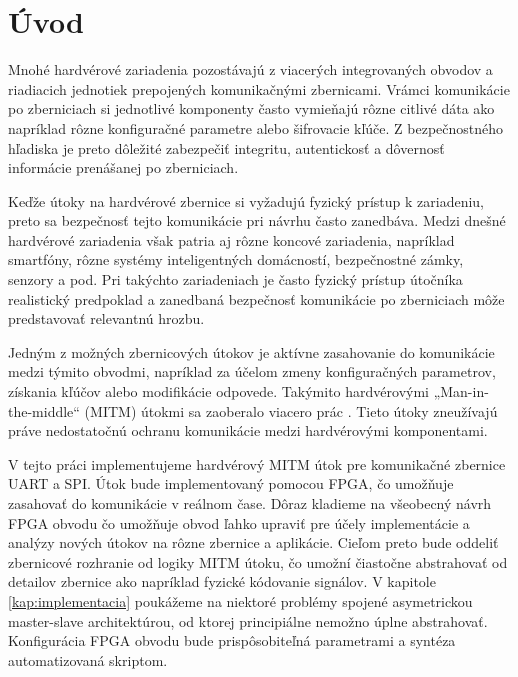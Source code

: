 \chapter*{Úvod} %

Mnohé hardvérové zariadenia pozostávajú z viacerých integrovaných obvodov a riadiacich jednotiek prepojených komunikačnými zbernicami. Vrámci komunikácie po zberniciach si jednotlivé komponenty často vymieňajú rôzne citlivé dáta ako napríklad rôzne konfiguračné parametre alebo šifrovacie kľúče.  Z bezpečnostného hľadiska je preto dôležité zabezpečiť integritu, autentickosť a dôvernosť informácie prenášanej po zberniciach.

Keďže útoky na hardvérové zbernice si vyžadujú fyzický prístup k zariadeniu, preto sa bezpečnosť tejto komunikácie pri návrhu často zanedbáva. Medzi dnešné hardvérové zariadenia však patria aj rôzne koncové zariadenia, napríklad smartfóny, rôzne systémy inteligentných domácností, bezpečnostné zámky, senzory a pod. Pri takýchto zariadeniach je často fyzický prístup útočníka realistický predpoklad a zanedbaná bezpečnosť komunikácie po zberniciach môže predstavovať relevantnú hrozbu.

Jedným z možných zbernicových útokov je aktívne zasahovanie do komunikácie medzi týmito obvodmi, napríklad za účelom zmeny konfiguračných parametrov, získania kľúčov alebo modifikácie odpovede. Takýmito hardvérovými „Man-in-the-middle“ (MITM) útokmi sa zaoberalo viacero prác \cite{mitmSmartphone, mitmTouch, mitmI2C, mitmCAN, mitmBitlocker, mitmTPM}. Tieto útoky zneužívajú práve nedostatočnú ochranu komunikácie medzi hardvérovými komponentami.

V tejto práci implementujeme hardvérový MITM útok pre komunikačné zbernice UART a SPI. Útok bude implementovaný pomocou FPGA, čo umožňuje zasahovať do komunikácie v reálnom čase. Dôraz kladieme na všeobecný návrh FPGA obvodu čo umožňuje obvod ľahko upraviť pre účely implementácie a analýzy nových útokov na rôzne zbernice a aplikácie. Cieľom preto bude oddeliť zbernicové rozhranie od logiky MITM útoku, čo umožní čiastočne abstrahovať od detailov zbernice ako napríklad fyzické kódovanie signálov. V kapitole \ref{kap:implementacia} poukážeme na niektoré problémy spojené asymetrickou master-slave architektúrou, od ktorej principiálne nemožno úplne abstrahovať. Konfigurácia FPGA obvodu bude prispôsobiteľná parametrami a syntéza automatizovaná skriptom.

